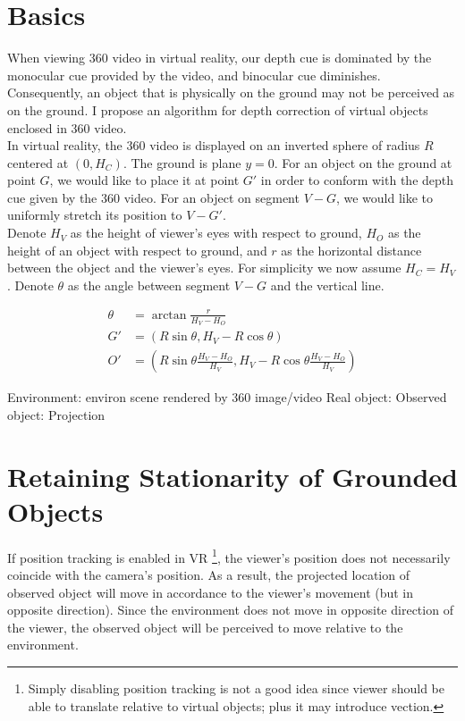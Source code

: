 \documentclass[12pt]{article}
\begin{document}
\section{Basics}

When viewing 360 video in virtual reality, our depth cue is dominated by the monocular cue provided by the video, and binocular cue diminishes. Consequently, an object that is physically on the ground may not be perceived as on the ground. I propose an algorithm for depth correction of virtual objects enclosed in 360 video. \\

In virtual reality, the 360 video is displayed on an inverted sphere of radius $R$ centered at $(0, H_C)$. The ground is plane $y = 0$. For an object on the ground at point $G$, we would like to place it at point $G'$ in order to conform with the depth cue given by the 360 video. For an object on segment $V-G$, we would like to uniformly stretch its position to $V-G'$. \\

Denote $H_V$ as the height of viewer's eyes with respect to ground, $H_O$ as the height of an object with respect to ground, and $r$ as the horizontal distance between the object and the viewer's eyes. For simplicity we now assume $H_C = H_V$. Denote $\theta$ as the angle between segment $V-G$ and the vertical line. 

\begin{align*}
	\theta &= \arctan{\frac{r}{H_V - H_O}} \\
	G' &= (R\sin{\theta}, H_V - R\cos{\theta}) \\
	O' &= (R\sin{\theta} \frac{H_V - H_O}{H_V}, H_V - R\cos{\theta}\frac{H_V - H_O}{H_V})
\end{align*}

Environment: environ scene rendered by 360 image/video
Real object: 
Observed object: 
Projection

\section{Retaining Stationarity of Grounded Objects}

If position tracking is enabled in VR \footnote{Simply disabling position tracking is not a good idea since viewer should be able to translate relative to virtual objects; plus it may introduce vection. }, the viewer's position does not necessarily coincide with the camera's position. As a result, the projected location of observed object will move in accordance to the viewer's movement (but in opposite direction). Since the environment does not move in opposite direction of the viewer, the observed object will be perceived to move relative to the environment. \\
\end{document}
